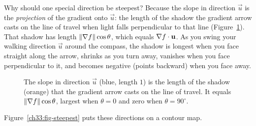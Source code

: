 \begin{intuitionbox}
Why should one special direction be steepest? Because the slope in direction
$\vec u$ is the \emph{projection} of the gradient onto $\vec u$: the length of the
shadow the gradient arrow casts on the line of travel when light falls
perpendicular to that line (Figure~\ref{ch33:fig-shadow}). That shadow has length
$\lVert\nabla f\rVert\cos\theta$, which equals $\nabla f\cdot\mathbf{u}$. As you swing
your walking direction $\vec u$ around the compass, the shadow is longest when you
face straight along the arrow, shrinks as you turn away, vanishes when you face
perpendicular to it, and becomes negative (points backward) when you face away.
\end{intuitionbox}

\begin{figure}[htbp]
\centering
{}
\caption{The slope in direction $\vec u$ (blue, length $1$) is the length of the
shadow (orange) that the gradient arrow casts on the line of travel. It equals $\lVert\nabla f\rVert\cos\theta$, largest when
$\theta=0$ and zero when $\theta=90^\circ$.}
\label{ch33:fig-shadow}
\end{figure}

Figure~\ref{ch33:fig-steepest} puts these directions on a contour map.

